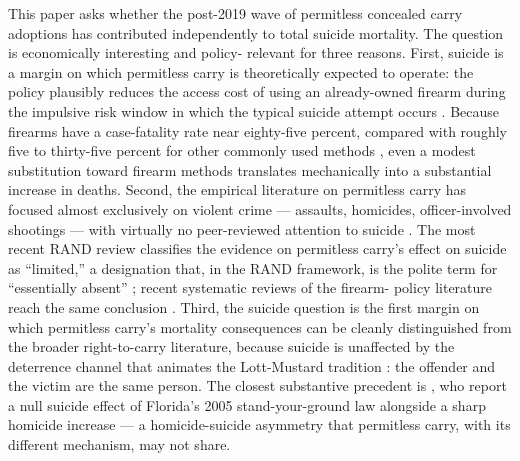 \documentclass[12pt]{article}
\newcommand{\citepg}[2]{\citep[][p.~#2]{#1}}  %
\begin{document}
This paper asks whether the post-2019 wave of permitless concealed
carry adoptions has contributed independently to total suicide
mortality. The question is economically interesting and policy-
relevant for three reasons. First, suicide is a margin on which
permitless carry is theoretically expected to operate: the policy
plausibly reduces the access cost of using an already-owned firearm
during the impulsive risk window in which the typical suicide
attempt occurs \citep{simon2001, hawton2007}. Because firearms have a
case-fatality rate near eighty-five percent, compared with roughly
five to thirty-five percent for other commonly used methods
\citepg{conner2019}{888}, even a modest substitution toward firearm
methods translates mechanically into a substantial increase in
deaths. Second, the empirical literature on permitless carry has
focused almost exclusively on violent crime --- assaults, homicides,
officer-involved shootings --- with virtually no peer-reviewed
attention to suicide \citep{doucette2023, doucette2022, hamill2019}.
The most recent RAND review classifies the evidence on permitless
carry's effect on suicide as ``limited,'' a designation that, in the
RAND framework, is the polite term for ``essentially absent''
\citepg{rand2024}{ch.~18}; recent systematic reviews of the firearm-
policy literature reach the same conclusion
\citep{santaella2016, leefirearm2017, cookdonohue2017}. Third, the
suicide question is the first margin on which permitless carry's
mortality consequences can be cleanly distinguished from the
broader right-to-carry literature, because suicide is unaffected
by the deterrence channel that animates the Lott-Mustard tradition
\citep{lott1997, ayres2003, blacknagin1998, donohue2019}: the
offender and the victim are the same person. The closest
substantive precedent is \citet{humphreys2017}, who report a null
suicide effect of Florida's 2005 stand-your-ground law alongside a
sharp homicide increase --- a homicide-suicide asymmetry that
permitless carry, with its different mechanism, may not share.
\end{document}
